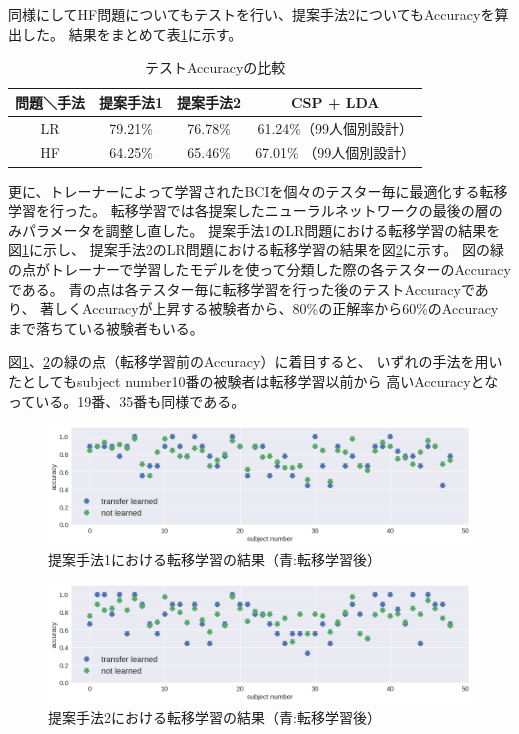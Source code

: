 同様にしてHF問題についてもテストを行い、提案手法2についてもAccuracyを算出した。
結果をまとめて表\ref{table:kekka}に示す。
\begin{table}[t]
    \centering
    \caption{テストAccuracyの比較}
        \begin{tabular}{|c|c|c|c|} \hline
            問題＼手法 & 提案手法1 & 提案手法2 & CSP + LDA \\ \hline
            LR &  79.21\%  & 76.78\%  & 61.24\%（99人個別設計）\\ \hline
            HF & 64.25\%  & 65.46\%  & 67.01\% （99人個別設計）\\ \hline
        \end{tabular}
    \label{table:kekka}
\end{table}

更に、トレーナーによって学習されたBCIを個々のテスター毎に最適化する転移学習を行った。
転移学習では各提案したニューラルネットワークの最後の層のみパラメータを調整し直した。
提案手法1のLR問題における転移学習の結果を図\ref{fig:trans1}に示し、
提案手法2のLR問題における転移学習の結果を図\ref{fig:trans2}に示す。
図の緑の点がトレーナーで学習したモデルを使って分類した際の各テスターのAccuracyである。
青の点は各テスター毎に転移学習を行った後のテストAccuracyであり、
著しくAccuracyが上昇する被験者から、80\%の正解率から60\%のAccuracyまで落ちている被験者もいる。

図\ref{fig:trans1}、\ref{fig:trans2}の緑の点（転移学習前のAccuracy）に着目すると、
いずれの手法を用いたとしてもsubject number10番の被験者は転移学習以前から
高いAccuracyとなっている。19番、35番も同様である。

\begin{figure}
    \centering
    \includegraphics[width=13cm]{images/trans_vs_not.png}
    \caption{提案手法1における転移学習の結果（青:転移学習後）}
    \label{fig:trans1}
\end{figure}
\begin{figure}
    \centering
    \includegraphics[width=13cm]{images/trans_vs_not_convLSTM.png}
    \caption{提案手法2における転移学習の結果（青:転移学習後）}
    \label{fig:trans2}
\end{figure}



